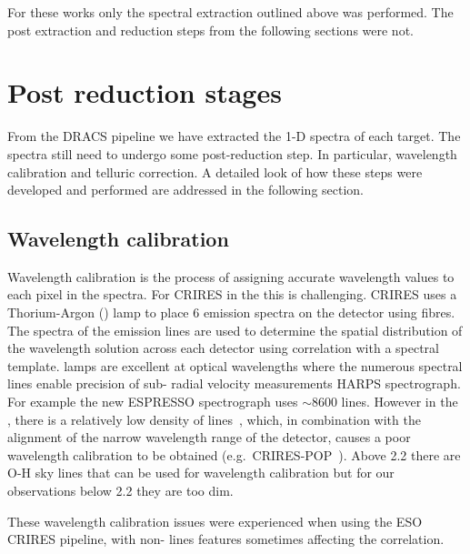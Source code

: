For these works only the spectral extraction outlined above was performed. The post extraction and reduction steps from the following sections were not.


\section{Post reduction stages}
\label{sec:posreduction}
From the {DRACS} pipeline we have extracted the 1-D spectra of each target. The spectra still need to undergo some post-reduction step. In particular, wavelength calibration and telluric correction. A detailed look of how these steps were developed and performed are addressed in the following section.

\subsection{Wavelength calibration}
\label{subsec:wavecalib}

Wavelength calibration is the process of assigning accurate wavelength values to each pixel in the spectra. For {CRIRES} in the \nir{} this is challenging.
{CRIRES} uses a Thorium-Argon (\thar) lamp to place 6 emission spectra on the detector using fibres.
The spectra of the \thar{} emission lines are used to determine the spatial distribution of the wavelength solution across each detector using correlation with a spectral template.
\thar{} lamps are excellent at optical wavelengths where the numerous spectral lines enable precision of sub-\mps{} radial velocity measurements HARPS spectrograph. For example the new ESPRESSO spectrograph uses \(\sim8600\) \thar{} lines.
However in the \nir{}, there is a relatively low density of \thar{} lines~\citep{kerber_laboratory_2009}, which, in combination with the alignment of the narrow wavelength range of the detector, causes a poor wavelength calibration to be obtained (e.g.\ {CRIRES}-POP~\citep{nicholls_crirespop_2017}).
Above 2.2\um{} there are {O-H} sky lines that can be used for wavelength calibration but for our observations below 2.2\um{} they are too dim.

These wavelength calibration issues were experienced when using the {ESO} {CRIRES} pipeline, with non-\thar{} lines features sometimes affecting the correlation.

